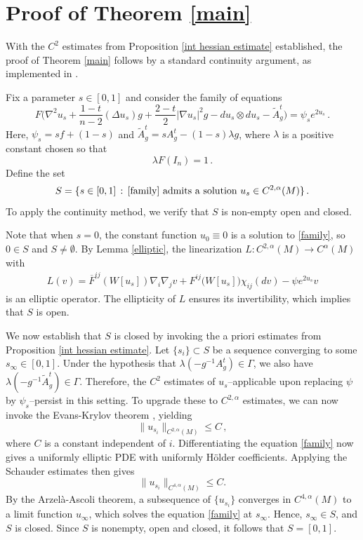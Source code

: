 \documentclass{article}
\theoremstyle{plain}
\theoremstyle{definition}
\theoremstyle{definition}
\numberwithin{equation}{section}
\begin{document}
\begin{sloppypar}
\section{Proof of Theorem \ref{main}}\label{proof}
With the $C^2$ estimates from Proposition \ref{int hessian estimate} established, the proof of Theorem \ref{main} follows by a standard continuity argument, as implemented in \cite{GV03}.

Fix a parameter $s \in [0,1]$ and consider the family of equations
\begin{equation}\label{family}
F\Big(\nabla^2u_{s}+\frac{1-t}{n-2}(\Delta u_{s})g+\frac{2-t}{2}|\nabla u_{s}|^2g-du_{s}\otimes du_{s}-\tilde{A}^{t}_{g}\Big)=\psi_{s}e^{2u_{s}}\,.
\end{equation}
Here, $\psi_s = s f + (1-s)$ and $\tilde{A}^{t}_{g} = s A^t_g - (1-s)\lambda g$, where $\lambda$ is a positive constant chosen so that
\[
\lambda F(I_{n})=1\,.
\]
Define the set
\[
S=\{s\in [0,1]\,:\, \eqref{family} \textrm{ admits a solution } u_{s}\in C^{2,\alpha}(M)\}\,.
\]
To apply the continuity method, we verify that $S$ is non-empty open and closed.

Note that when $s = 0$, the constant function $u_0 \equiv 0$ is a solution to \eqref{family}, so $0 \in S$ and $S \neq \emptyset$.  By Lemma \ref{elliptic}, the linearization $L: C^{2,\alpha}(M) \to C^{\alpha}(M)$ with
\[
\begin{split}
L(v)=\overline{F}^{ij}(W[u_{s}])\nabla_{i}\nabla_{j}v+F^{ij}\big(W[u_{s}]\big)\chi_{ij}(dv)-\psi e^{2u_{s}}v
\end{split}
\]
is an elliptic operator. The ellipticity of $L$ ensures its invertibility, which implies that $S$ is open. 

We now establish that $S$ is closed by invoking the a priori estimates from Proposition \ref{int hessian estimate}. Let $\{s_{i}\}\subset S$ be a sequence converging to some $s_{\infty}\in [0,1]$.
Under the hypothesis that $\lambda(-g^{-1}A_{g}^{t})\in \Gamma$, we also have $\lambda(-g^{-1}\tilde{A}^{t}_{g})\in \Gamma$. Therefore, the $C^2$ estimates of $u_{s}$--applicable upon replacing $\psi$ by $\psi_{s}$--persist in this setting.  To upgrade these to $C^{2,\alpha}$ estimates, we can now invoke the Evans-Krylov theorem \cite{E82,GT83}, yielding
\[
\|u_{s_i}\|_{C^{2,\alpha}(M)}\leq C\,,
\]
where $C$ is a constant independent of $i$. Differentiating the equation \eqref{family} now gives a uniformly elliptic PDE with uniformly H\"older coefficients. Applying the Schauder estimates then gives
\[
\|u_{s_i}\|_{C^{4,\alpha}(M)}\leq C.
\]
By the Arzel\`a-Ascoli theorem, a subsequence of $\{u_{s_i}\}$  converges in $ C^{4,\alpha}(M)$ to a limit function $u_{\infty}$, which solves the equation \eqref{family} at $s_{\infty}$. Hence, $s_{\infty}\in S$, and $S$ is closed. Since $S$ is nonempty, open and closed, it follows that  $S=[0,1]$.


\end{sloppypar}
\end{document}
